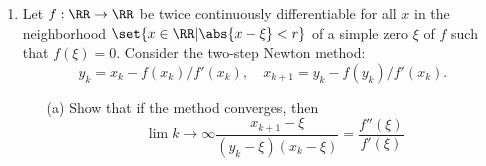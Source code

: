 \documentclass[11pt]{article}
\begin{document}
\begin{enumerate}
        \begin{proof}
            The Ritz values are the eigenvalues of $T_n$ the tridiagonal matrix.
            In this case $A = Q_n^* T_n Q_n$.
            So if $\v{y} = Q_n \v{x}$ is an eigenvector of $T_n$, with a corresponding Ritz
            value, then
            \begin{align*}
                r(\v{x}) &= \frac{\v{x}^T A \v{x}}{\v{x}^T \v{x}} \\
                &= \frac{\v{x}^T Q_n^* T_n Q_n \v{x}}{\v{x}^T \v{x}} \\
                &= \frac{\v{x}^T Q_n^* T_n Q_n \v{x}}{\v{x}^T Q_n^* Q_n \v{x}} \\
                &= \frac{\v{y}^T T_n \v{y}^T}{\v{y}^T \v{y}} \\
            \end{align*}
            This is the Ritz value associated with $\v{y}$ at the nth step,
            so the Ritz values are stationary for the Rayleigh quotient.
        \end{proof}

    \item %
        Let $f:\RR \to \RR$ be twice continuously differentiable for all $x$ in
        the neighborhood $\set{x \in \RR | \abs{x - \xi} < r}$ of a simple zero
        $\xi$ of $f$ such that $f(\xi) = 0$.
        Consider the two-step Newton method:
        \[
            y_k = x_k - f(x_k)/f'(x_k), \quad x_{k+1} = y_k - f(y_k)/f'(x_k).
        \]
        \begin{enumerate}
            \item[(a)] %
                Show that if the method converges, then
                \[
                    \lim{k \to \infty}{\frac{x_{k+1} - \xi}{(y_k - \xi)(x_k - \xi)}} = \frac{f''(\xi)}{f'(\xi)}
                \]


\end{enumerate}
\end{enumerate}
\end{document}
